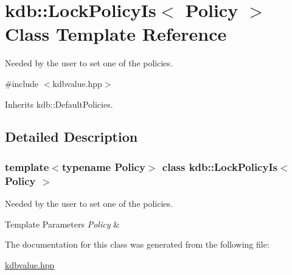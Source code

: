 \hypertarget{classkdb_1_1LockPolicyIs}{}\section{kdb\+:\+:Lock\+Policy\+Is$<$ Policy $>$ Class Template Reference}
\label{classkdb_1_1LockPolicyIs}


Needed by the user to set one of the policies.  




{\ttfamily \#include $<$kdbvalue.\+hpp$>$}



Inherits kdb\+::\+Default\+Policies.



\subsection{Detailed Description}
\subsubsection*{template$<$typename Policy$>$\newline
class kdb\+::\+Lock\+Policy\+Is$<$ Policy $>$}

Needed by the user to set one of the policies. 


\begin{DoxyTemplParams}{Template Parameters}
{\em Policy} & \\
\hline
\end{DoxyTemplParams}


The documentation for this class was generated from the following file\+:\begin{DoxyCompactItemize}
\item 
\hyperlink{kdbvalue_8hpp}{kdbvalue.\+hpp}\end{DoxyCompactItemize}
